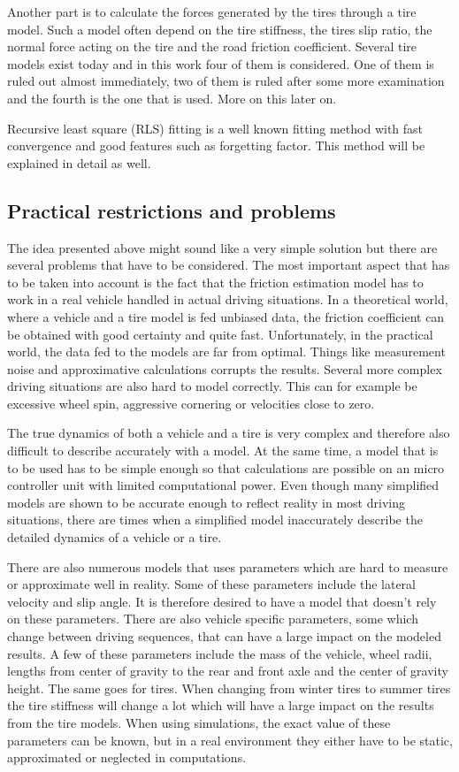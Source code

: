 Another part is to calculate the forces generated by the tires through a tire model. Such a model often depend on the tire stiffness, the tires slip ratio, the normal force acting on the tire and the road friction coefficient. Several tire models exist today and in this work four of them is considered. One of them is ruled out almost immediately, two of them is ruled after some more examination and the fourth is the one that is used. More on this later on.

Recursive least square (RLS) fitting is a well known fitting method with fast convergence and good features such as forgetting factor. This method will be explained in detail as well.

\subsection{Practical restrictions and problems}
The idea presented above might sound like a very simple solution but there are several problems that have to be considered. The most important aspect that has to be taken into account is the fact that the friction estimation model has to work in a real vehicle handled in actual driving situations. In a theoretical world, where a vehicle and a tire model is fed unbiased data, the friction coefficient can be obtained with good certainty and quite fast. Unfortunately, in the practical world, the data fed to the models are far from optimal. Things like measurement noise and approximative calculations corrupts the results. Several more complex driving situations are also hard to model correctly. This can for example be excessive wheel spin, aggressive cornering or velocities close to zero.

The true dynamics of both a vehicle and a tire is very complex and therefore also difficult to describe accurately with a model. At the same time, a model that is to be used has to be simple enough so that calculations are possible on an micro controller unit with limited computational power. Even though many simplified models are shown to be accurate enough to reflect reality in most driving situations, there are times when a simplified model inaccurately describe the detailed dynamics of a vehicle or a tire. 

There are also numerous models that uses parameters which are hard to measure or approximate well in reality. Some of these parameters include the lateral velocity and slip angle. It is therefore desired to have a model that doesn't rely on these parameters. There are also vehicle specific parameters, some which change between driving sequences, that can have a large impact on the modeled results. A few of these parameters include the mass of the vehicle, wheel radii, lengths from center of gravity to the rear and front axle and the center of gravity height. The same goes for tires. When changing from winter tires to summer tires the tire stiffness will change a lot which will have a large impact on the results from the tire models. When using simulations, the exact value of these parameters can be known, but in a real environment they either have to be static, approximated or neglected in computations.

